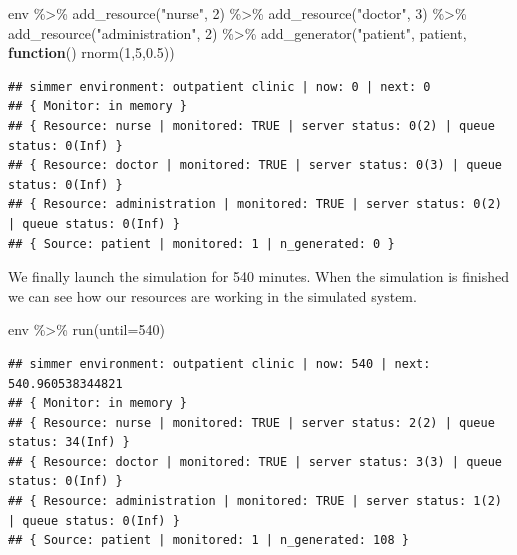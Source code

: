 \documentclass[
]{book}
\newenvironment{Shaded}{\begin{snugshade}}{\end{snugshade}}
\newcommand{\AttributeTok}[1]{\textcolor[rgb]{0.77,0.63,0.00}{#1}}
\newcommand{\ControlFlowTok}[1]{\textcolor[rgb]{0.13,0.29,0.53}{\textbf{#1}}}
\newcommand{\DecValTok}[1]{\textcolor[rgb]{0.00,0.00,0.81}{#1}}
\newcommand{\FloatTok}[1]{\textcolor[rgb]{0.00,0.00,0.81}{#1}}
\newcommand{\FunctionTok}[1]{\textcolor[rgb]{0.00,0.00,0.00}{#1}}
\newcommand{\NormalTok}[1]{#1}
\newcommand{\SpecialCharTok}[1]{\textcolor[rgb]{0.00,0.00,0.00}{#1}}
\newcommand{\StringTok}[1]{\textcolor[rgb]{0.31,0.60,0.02}{#1}}
\begin{document}
\begin{Shaded}
\begin{Highlighting}[]
\NormalTok{env }\SpecialCharTok{\%\textgreater{}\%}
  \FunctionTok{add\_resource}\NormalTok{(}\StringTok{"nurse"}\NormalTok{, }\DecValTok{2}\NormalTok{) }\SpecialCharTok{\%\textgreater{}\%}
  \FunctionTok{add\_resource}\NormalTok{(}\StringTok{"doctor"}\NormalTok{, }\DecValTok{3}\NormalTok{) }\SpecialCharTok{\%\textgreater{}\%}
  \FunctionTok{add\_resource}\NormalTok{(}\StringTok{"administration"}\NormalTok{, }\DecValTok{2}\NormalTok{) }\SpecialCharTok{\%\textgreater{}\%}
  \FunctionTok{add\_generator}\NormalTok{(}\StringTok{"patient"}\NormalTok{, patient, }\ControlFlowTok{function}\NormalTok{() }\FunctionTok{rnorm}\NormalTok{(}\DecValTok{1}\NormalTok{,}\DecValTok{5}\NormalTok{,}\FloatTok{0.5}\NormalTok{))}
\end{Highlighting}
\end{Shaded}

\begin{verbatim}
## simmer environment: outpatient clinic | now: 0 | next: 0
## { Monitor: in memory }
## { Resource: nurse | monitored: TRUE | server status: 0(2) | queue status: 0(Inf) }
## { Resource: doctor | monitored: TRUE | server status: 0(3) | queue status: 0(Inf) }
## { Resource: administration | monitored: TRUE | server status: 0(2) | queue status: 0(Inf) }
## { Source: patient | monitored: 1 | n_generated: 0 }
\end{verbatim}

We finally launch the simulation for 540 minutes. When the simulation is finished we can see how our resources are working in the simulated system.

\begin{Shaded}
\begin{Highlighting}[]
\NormalTok{env }\SpecialCharTok{\%\textgreater{}\%}
  \FunctionTok{run}\NormalTok{(}\AttributeTok{until=}\DecValTok{540}\NormalTok{)}
\end{Highlighting}
\end{Shaded}

\begin{verbatim}
## simmer environment: outpatient clinic | now: 540 | next: 540.960538344821
## { Monitor: in memory }
## { Resource: nurse | monitored: TRUE | server status: 2(2) | queue status: 34(Inf) }
## { Resource: doctor | monitored: TRUE | server status: 3(3) | queue status: 0(Inf) }
## { Resource: administration | monitored: TRUE | server status: 1(2) | queue status: 0(Inf) }
## { Source: patient | monitored: 1 | n_generated: 108 }
\end{verbatim}
\end{document}
